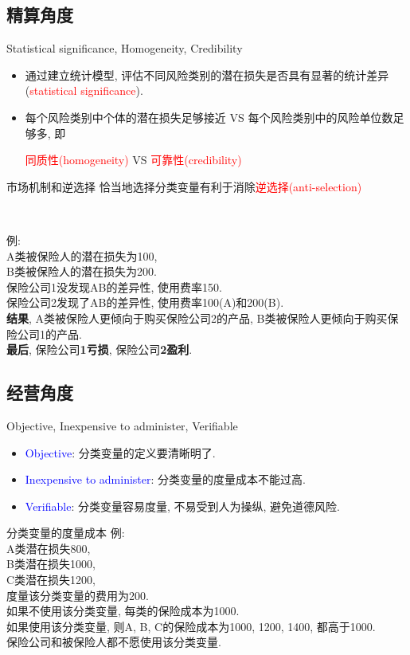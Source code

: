 \documentclass[professionalfont]{beamer}
\newcommand{\red}[1]{\textcolor{red}{#1}}
\newcommand{\blue}[1]{\textcolor{blue}{#1}}
\begin{document}
\subsection{精算角度}
\begin{frame}{Statistical significance, Homogeneity, Credibility}

	\begin{itemize}
		\item 通过建立统计模型, 评估不同风险类别的潜在损失是否具有显著的统计差异(\red{statistical significance}).
		\item 每个风险类别中个体的潜在损失足够接近 VS 每个风险类别中的风险单位数足够多, 即 \\
	        \begin{center}{\red{同质性(homogeneity)} VS \red{可靠性(credibility)}}\end{center}
\end{itemize}
\end{frame}
\begin{frame}{市场机制和逆选择}
	恰当地选择分类变量有利于消除\red{逆选择(anti-selection)}
	
	~
	
	例: \\
	A类被保险人的潜在损失为100, \\
	B类被保险人的潜在损失为200. \\
	保险公司1没发现AB的差异性, 使用费率150. \\
	保险公司2发现了AB的差异性, 使用费率100(A)和200(B). \\
	\textbf{结果}, A类被保险人更倾向于购买保险公司2的产品, B类被保险人更倾向于购买保险公司1的产品. \\
	\textbf{最后}, 保险公司\textbf{1亏损}, 保险公司\textbf{2盈利}.
\end{frame}
\subsection{经营角度}
\begin{frame}{Objective, Inexpensive to administer, Verifiable}
\begin{itemize}
	\item \blue{Objective}: 分类变量的定义要清晰明了. 
	\item \blue{Inexpensive to administer}: 分类变量的度量成本不能过高. 
	\item \blue{Verifiable}: 分类变量容易度量, 不易受到人为操纵, 避免道德风险. 
\end{itemize}
\end{frame}
\begin{frame}{分类变量的度量成本}
	 例:\\
	 A类潜在损失800, \\
	 B类潜在损失1000, \\
	 C类潜在损失1200, \\
	 度量该分类变量的费用为200.\\
	 如果不使用该分类变量, 每类的保险成本为1000. \\
	 如果使用该分类变量, 则A, B, C的保险成本为1000, 1200, 1400, 都高于1000. \\
	 保险公司和被保险人都不愿使用该分类变量.
\end{frame}
\end{document}

